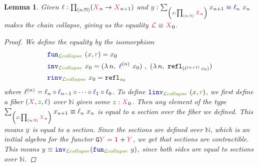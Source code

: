 \documentclass[twoside,11pt,openright]{report}
\theoremstyle{plain} %
\newtheorem{lem}[thm]{Lemma}
\theoremstyle{definition}
\theoremstyle{remark}
\newcommand*{\term}[1]{\textcolor{green!30!black}{#1}} %
\newcommand*{\pathterm}[1]{\textcolor{green!65!red!75!black}{#1}}
\newcommand*{\type}[1]{\textcolor{magenta!90!black}{#1}}
\newcommand*{\unit}{\type{\textbf{1}}}
\newcommand*{\function}[1]{\textcolor{blue!60!black}{\ensuremath{\mathtt{#1}}}}
\newcommand*{\functor}[1]{\ensuremath{\mathbf{\mathtt{#1}}}}
\begin{document}
\begin{lem}\label{lem:limit-collapse}
  Given \(\function{\ell} : \prod_{(n : \mathbb{N})} (\type{X}_{n} \rightarrow \type{X}_{n+1})\) and \(\term{y} : \sum_{\left(\term{x} : \prod_{(n : \mathbb{N})} \type{X}_n\right)} \term{x}_{n + 1} \equiv \function{\ell}_n~\term{x}_n\) makes the chain collapse, giving us the equality \(\type{\mathcal{L}} \equiv \type{X}_0\).
  \begin{proof}
    We define the equality by the isomorphism
    \begin{align}
      &\function{fun}_{\pathterm{\mathcal{L}collapse}}~(\term{x} , \pathterm{r}) = \term{x}_0 \\
      &\function{inv}_{\pathterm{\mathcal{L}collapse}}~\term{x}_0 = (\lambda\,n,~\function{\ell}^{(n)}~\term{x}_0)~,~(\lambda\,n,~\mathtt{refl}_{(\function{\ell}^{(n+1)}\,\term{x}_0)}) \\
      &\function{rinv}_{\pathterm{\mathcal{L}collapse}}~\term{x}_0 = \mathtt{refl}_{\term{x}_0}
    \end{align}
    where \(\function{\ell}^{(n)} = \function{\ell}_n \circ \function{\ell}_{n-1} \circ \dots \circ \function{\ell}_1 \circ \function{\ell}_0\). To define \(\function{linv}_{\pathterm{\mathcal{L}collapse}}~(\term{x} , \pathterm{r})\), we first define a fiber \((\type{X} , \term{z}, \function{\ell})\) over \(\mathbb{N}\) given some \(\term{z} : \type{X}_0\). Then any element of the type \(\sum_{\left(\term{x} : \prod_{(n : \mathbb{N})} \type{X}_n\right)} \term{x}_{n + 1} \equiv \function{\ell}_n~\term{x}_n\) is equal to a section over the fiber we defined. This means \(\term{y}\) is equal to a section. Since the sections are defined over \(\mathbb{N}\), which is an initial algebra for the functor \(\functor{G}\type{Y} = \unit + \type{Y}\), we get that sections are contractible. This means \(\term{y} \equiv \function{inv}_{\pathterm{\mathcal{L}collapse}} (\function{fun}_{\pathterm{\mathcal{L}collapse}}~\term{y})\), since both sides are equal to sections over \(\mathbb{N}\).
\end{proof}
\end{lem}
\end{document}
